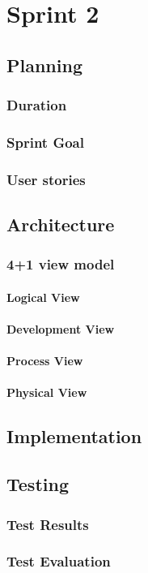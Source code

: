 \chapter{Sprint 2}
\section{Planning}
\subsection{Duration}
\subsection{Sprint Goal}
\subsection{User stories}
\section{Architecture}
\subsection{4+1 view model}
\subsubsection{Logical View}
\subsubsection{Development View}
\subsubsection{Process View}
\subsubsection{Physical View}
\section{Implementation}
\section{Testing}
\subsection{Test Results}
\subsection{Test Evaluation}

